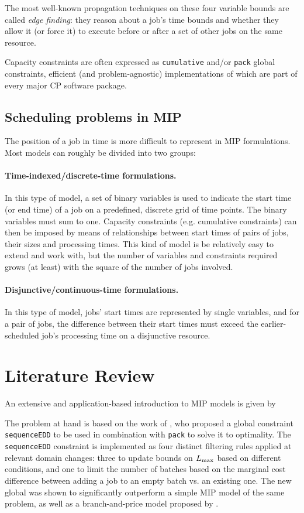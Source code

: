 \documentclass[13pt, letterpaper, oneside]{book}
\begin{document}
The most well-known propagation techniques on these four variable bounds are
called \textit{edge finding}: they reason about a job's time bounds and whether
they allow it (or force it) to execute before or after a set of other jobs on
the same resource.

Capacity constraints are often expressed as \texttt{cumulative} and/or
\texttt{pack} global constraints, efficient (and problem-agnostic)
implementations of which are part of every major CP software package.

\subsection{Scheduling problems in MIP}
The position of a job in time is more difficult to represent in MIP
formulations. Most models can roughly be divided into two groups:

\paragraph{Time-indexed/discrete-time formulations.} In this type of model, a set of binary
variables is used to indicate the start time (or end time) of a job on a
predefined, discrete grid of time points. The binary variables must sum to one.
Capacity constraints (e.g. cumulative constraints) can then be imposed by means
of relationships between start times of pairs of jobs, their sizes and
processing times. This kind of model is be relatively easy to extend and work
with, but the number of variables and constraints required grows (at least) with
the square of the number of jobs involved.

\paragraph{Disjunctive/continuous-time formulations.}
In this type of model, jobs' start times are represented by single variables,
and for a pair of jobs, the difference between their start times must exceed the
earlier-scheduled job's processing time on a disjunctive resource.

\section{Literature Review}
An extensive and application-based introduction to MIP models is given by
\citet{williams}

The problem at hand is based on the work of \citet{Malapert}, who proposed a global
constraint \texttt{sequenceEDD} to be used in combination with \texttt{pack} to
solve it to optimality. The \texttt{sequenceEDD} constraint is implemented as
four distinct filtering rules applied at relevant domain changes: three to update
bounds on $L_{\text{max}}$ based on different conditions, and one to limit the number of
batches based on the marginal cost difference between adding a job to an empty
batch vs. an existing one. The new global was shown to significantly outperform
a simple MIP model of the same problem, as well as a branch-and-price model
proposed by \citet{Daste1}.
\end{document}

